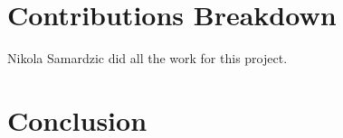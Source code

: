 \section{Contributions Breakdown}

Nikola Samardzic did all the work for this project.

\section{Conclusion}\label{sec:conclusion}

